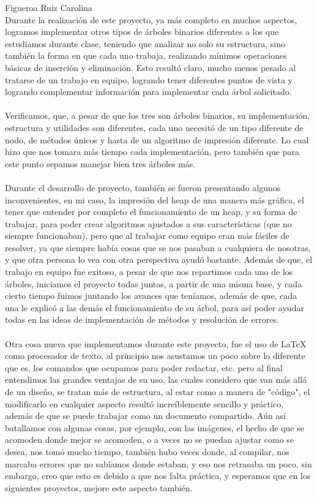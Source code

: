\documentclass{report}
\begin{document}
Figueroa Ruiz Carolina\\
Durante la realización de este proyecto, ya más completo en muchos aspectos, logramos implementar otros tipos de árboles binarios diferentes a los que estudiamos durante clase, teniendo que analizar no solo su estructura, sino también la forma en que cada uno trabaja, realizando mínimos operaciones básicas de inserción y eliminación. Esto resultó claro, mucho menos pesado al tratarse de un trabajo en equipo, logrando tener diferentes puntos de vista y logrando complementar información para implementar cada árbol solicitado.\\\\
Verificamos, que, a pesar de que los tres son árboles binarios, su implementación, estructura y utilidades son diferentes, cada uno necesitó de un tipo diferente de nodo, de métodos únicos y hasta de un algoritmo de impresión diferente. Lo cual hizo que nos tomara más tiempo cada implementación, pero también que para este punto sepamos manejar bien tres árboles más.\\\\
Durante el desarrollo de proyecto, también se fueron presentando algunos inconvenientes, en mi caso, la impresión del heap de una manera más gráfica, el tener que entender por completo el funcionamiento de un heap, y su forma de trabajar, para poder crear algoritmos ajustados a sus características (que no siempre funcionaban), pero que al trabajar como equipo eran más fáciles de resolver, ya que siempre había cosas que se nos pasaban a cualquiera de nosotras, y que otra persona lo vea con otra perspectiva ayudó bastante. Además de que, el trabajo en equipo fue exitoso, a pesar de que nos repartimos cada uno de los árboles, iniciamos el proyecto todas juntas, a partir de una misma base, y cada cierto tiempo fuimos juntando los avances que teníamos, además de que, cada una le explicó a las demás el funcionamiento de su árbol, para así poder ayudar todas en las ideas de implementación de métodos y resolución de errores.\\\\
Otra cosa nueva que implementamos durante este proyecto, fue el uso de \LaTeX \\como procesador de texto, al principio nos asustamos un poco sobre lo diferente que es, los comandos que ocupamos para poder redactar, etc. pero al final entendimos las grandes ventajas de su uso, las cuales considero que van más allá de un diseño, se tratan más de estructura, al estar como a manera de "código", el modificarlo en cualquier aspecto resultó increíblemente sencillo y práctico, además de que se puede trabajar como un documento compartido. Aún así batallamos con algunas cosas, por ejemplo, con las imágenes, el hecho de que se acomoden donde mejor se acomoden, o a veces no se puedan ajustar como se desea, nos tomó mucho tiempo, también hubo veces donde, al compilar, nos marcaba errores que no sabíamos donde estaban, y eso nos retrasaba un poco, sin embargo, creo que esto es debido a que nos falta práctica, y esperamos que en los siguientes proyectos, mejore este aspecto también. \\\\
\end{document}
